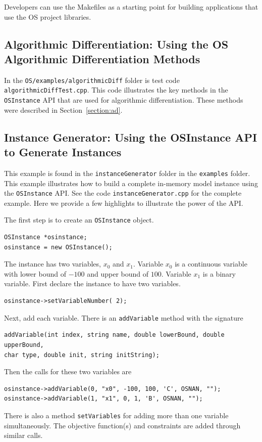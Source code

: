 \documentclass[11pt]{article}
\renewcommand{\_}{{\char"5F}}
\renewcommand{\{}{{\char"7B}}
\renewcommand{\}}{{\char"7D}}
\renewcommand{\^}{{\char"0D}}
\renewcommand{\'}{{\char"0D}}
\begin{document}
\begin{enumerate}[Step 1:]
Developers can use the Makefiles as a starting point for building applications that use the OS project libraries.


\subsection{Algorithmic Differentiation:  Using the OS Algorithmic Differentiation Methods}\label{section:cppad}

In the {\tt OS/examples/algorithmicDiff} folder is test code {\tt algorithmicDiffTest.cpp}. This code 
illustrates the key methods in the {\tt OSInstance} API that are used for 
algorithmic differentiation.   These methods were described in Section~\ref{section:ad}.



\subsection{Instance Generator: Using the OSInstance API to Generate Instances}\label{section:exampleOSInstanceGeneration}

This example is found in the {\tt instanceGenerator} folder in the {\tt examples} folder. This example illustrates 
how to build a complete in-memory model instance using the {\tt OSInstance} API.   
See the code {\tt instanceGenerator.cpp} for the complete example. Here we provide a few highlights to illustrate 
the power of the API.

The first step is to create an {\tt OSInstance} object.
\begin{verbatim}
OSInstance *osinstance;
osinstance = new OSInstance();
\end{verbatim}

The instance has two variables, $x_{0}$ and $x_{1}$. Variable $x_{0}$ is a continuous variable with lower bound of $-100$ and upper bound of $100$. Variable $x_{1}$ is a binary variable. First declare the instance to have two variables.
\begin{verbatim}
osinstance->setVariableNumber( 2);
\end{verbatim}
Next, add each variable. There is an {\tt addVariable} method with the signature
\begin{verbatim}
addVariable(int index, string name, double lowerBound, double upperBound,
char type, double init, string initString);
\end{verbatim}
Then the calls for these two variables are
\begin{verbatim}
osinstance->addVariable(0, "x0", -100, 100, 'C', OSNAN, "");
osinstance->addVariable(1, "x1", 0, 1, 'B', OSNAN, "");
\end{verbatim}
There is also a method {\tt setVariables} for adding more than one variable simultaneously.  The objective function(s) and constraints are added through similar calls.


\end{enumerate}
\end{document}
